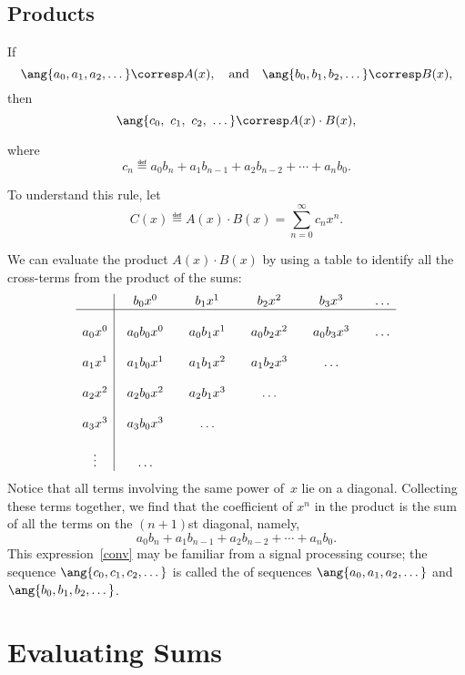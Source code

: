 \subsection{Products}

\begin{rul}
\label{rule:product}
If
%
\[
\ang{a_0, a_1, a_2, \dots} \corresp A(x),\quad \text{and}\quad
\ang{b_0, b_1, b_2, \dots} \corresp B(x),
\]
%
then
%
\[
\ang{c_0,\ c_1 ,\ c_2,\ \dots} \corresp A(x) \cdot B(x),
\]
\end{rul}
where
\[
c_n \eqdef a_0 b_n + a_1 b_{n-1} + a_2 b_{n-2} + \cdots + a_n b_0.
\]

To understand this rule, let
\[
C(x) \eqdef A(x) \cdot B(x) = \sum_{n=0}^{\infty} c_n x^n.
\]

We can evaluate the product $A(x) \cdot B(x)$ by using a table to identify
all the cross-terms from the product of the sums:
%
\[
\begin{array}{c|@{\quad}c@{\qquad}c@{\qquad}c@{\qquad}c@{\qquad}c}
        & b_0 x^0 & b_1 x^1 & b_2 x^2 & b_3 x^3 & \dots \\
\hline
\\
a_0 x^0 & a_0 b_0 x^0 & a_0 b_1 x^1 & a_0 b_2 x^2 & a_0 b_3 x^3 & \dots \\
\\
a_1 x^1 & a_1 b_0 x^1 & a_1 b_1 x^2 & a_1 b_2 x^3 & \dots \\
\\
a_2 x^2 & a_2 b_0 x^2 & a_2 b_1 x^3 & \dots \\
\\
a_3 x^3 & a_3 b_0 x^3 & \dots \\
\\
\vdots & \dots\\
\end{array}
\]
%
Notice that all terms involving the same power of~$x$ lie on a
diagonal.  Collecting these terms together, we find that the
coefficient of $x^n$ in the product is the sum of all the terms on the
$(n+1)$st diagonal, namely,
\begin{equation}\label{conv}
a_0 b_n + a_1 b_{n-1} + a_2 b_{n-2} + \cdots + a_n b_0.
\end{equation}
This expression~\eqref{conv} may be familiar from a signal processing
course; the sequence $\ang{c_0, c_1, c_2, \dots}$ is called the
 of sequences $\ang{a_0, a_1, a_2, \dots}$ and
$\ang{b_0, b_1, b_2, \dots}$.

\section{Evaluating Sums}

